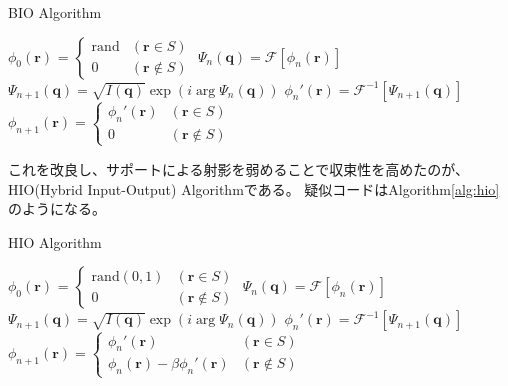 \newcommand{\pos} {
    \mathbf{r}
}
\newcommand{\rpos} {
    \mathbf{q}
}

\begin{algorithm}                      
\caption{BIO Algorithm}         
\label{alg:bio}                          
\begin{algorithmic}
    \STATE $\phi_0(\pos)$
      = $\begin{cases}
        \mathrm{rand} & (\pos \in S) \\
        0 & (\pos \notin S)
      \end{cases}$
    \STATE $\Psi_n(\rpos) = \mathcal F [\phi_n(\pos)]$
    \STATE $\Psi_{n+1}(\rpos) = \sqrt{I(\rpos)} \exp \left( i \arg \Psi_n(\rpos) \right)$ 
    \STATE $\phi_n'(\pos) = \mathcal F^{-1} [\Psi_{n+1}(\rpos)]$
    \STATE $\phi_{n+1}(\pos)
      = \begin{cases}
          \phi_n'(\pos) & (\pos \in S) \\
          0 & (\pos \notin S)
      \end{cases}$
    \ENDFOR
\end{algorithmic}
\end{algorithm}

これを改良し、サポートによる射影を弱めることで収束性を高めたのが、HIO(Hybrid Input-Output) Algorithmである。
疑似コードはAlgorithm\ref{alg:hio}のようになる。

\begin{algorithm}                      
\caption{HIO Algorithm}         
\label{alg:hio}                          
\begin{algorithmic}
    \STATE $\phi_0(\pos)$
      = $\begin{cases}
        \mathrm{rand}(0,1) & (\pos \in S) \\
        0 & (\pos \notin S)
      \end{cases}$
    \STATE $\Psi_n(\rpos) = \mathcal F [\phi_n(\pos)]$
    \STATE $\Psi_{n+1}(\rpos) = \sqrt{I(\rpos)} \exp \left( i \arg \Psi_n(\rpos) \right)$ 
    \STATE $\phi_n'(\pos) = \mathcal F^{-1} [\Psi_{n+1}(\rpos)]$
    \STATE $\phi_{n+1}(\pos)
      = \begin{cases}
          \phi_n'(\pos) & (\pos \in S) \\
          \phi_n(\pos) - \beta \phi_n'(\pos) & (\pos \notin S)
      \end{cases}$
    \ENDFOR
\end{algorithmic}
\end{algorithm}

